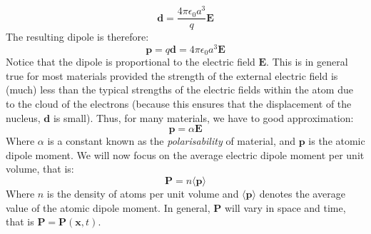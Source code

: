 \documentclass[a4paper]{article}
\numberwithin{equation}{section}
\begin{document}
\begin{equation}
\mathbf{d}=\frac{4 \pi \epsilon_0 a^3}{q} \mathbf{E}
\end{equation}
The resulting dipole is therefore:
\begin{equation}
\mathbf{p}=q\mathbf{d} = 4 \pi \epsilon_0 a^3 \mathbf{E}
\end{equation}
Notice that the dipole is proportional to the electric field $\mathbf{E}$. This is in general true for most materials provided the strength of the external electric field is (much) less than the typical strengths of the electric fields within the atom due to the cloud of the electrons (because this ensures that the displacement of the nucleus, $\mathbf{d}$ is small). Thus, for many materials, we have to good approximation:
\begin{equation} \label{linear dielectric}
\mathbf{p} = \alpha \mathbf{E}
\end{equation}
Where $\alpha$ is a constant known as the \textit{polarisability} of material, and $\mathbf{p}$ is the atomic dipole moment. We will now focus on the average electric dipole moment per unit volume, that is:
\begin{equation}
\mathbf{P}=n \langle \mathbf{p} \rangle
\end{equation}
Where $n$ is the density of atoms per unit volume and $ \langle \mathbf{p} \rangle$ denotes the average value of the atomic dipole moment. In general, $\mathbf{P}$ will vary in space and time, that is $\mathbf{P}=\mathbf{P}(\mathbf{x},t)$.
\end{document}
